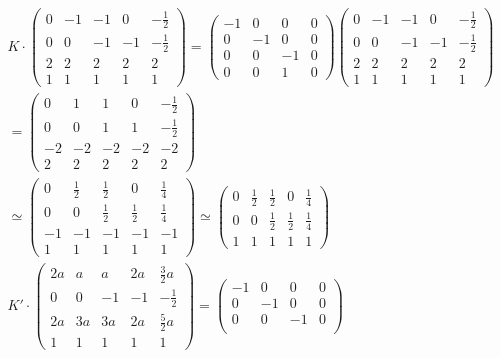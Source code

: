\begin{gather}
	K \cdot 
	\begin{pmatrix}
		0&-1&-1&0&-\frac{1}{2}\\
		0&0&-1&-1&-\frac{1}{2}\\
		2&2&2&2&2\\
		1&1&1&1&1
	\end{pmatrix}=
	\begin{pmatrix}
		-1&0&0&0\\
		0&-1&0&0\\
		0&0&-1&0\\
		0&0&1&0
	\end{pmatrix}
	\begin{pmatrix}
		0&-1&-1&0&-\frac{1}{2}\\
		0&0&-1&-1&-\frac{1}{2}\\
		2&2&2&2&2\\
		1&1&1&1&1
	\end{pmatrix}\\=
	\begin{pmatrix}
		0&1&1&0&-\frac{1}{2}\\
		0&0&1&1&-\frac{1}{2}\\
		-2&-2&-2&-2&-2\\
		2&2&2&2&2
	\end{pmatrix}\\
	\simeq
	\begin{pmatrix}
		0&\frac{1}{2}&\frac{1}{2}&0&\frac{1}{4}\\
		0&0&\frac{1}{2}&\frac{1}{2}&\frac{1}{4}\\
		-1&-1&-1&-1&-1\\
		1&1&1&1&1
	\end{pmatrix}	
	\simeq
	\begin{pmatrix}
		0&\frac{1}{2}&\frac{1}{2}&0&\frac{1}{4}\\
		0&0&\frac{1}{2}&\frac{1}{2}&\frac{1}{4}\\
		1&1&1&1&1
	\end{pmatrix}\\
	K' \cdot 	\begin{pmatrix}
		2a&a&a&2a&\frac{3}{2}a\\
		0&0&-1&-1&-\frac{1}{2}\\
		2a&3a&3a&2a&\frac{5}{2}a\\
		1&1&1&1&1
	\end{pmatrix}=
	\begin{pmatrix}
		-1&0&0&0\\
		0&-1&0&0\\
		0&0&-1&0\\

\end{pmatrix}
\end{gather}
